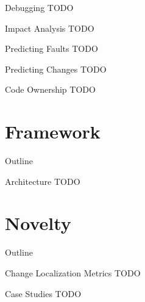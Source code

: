 
\begin{frame}{Debugging}
  TODO
\end{frame}


\begin{frame}{Impact Analysis}
  TODO
\end{frame}


\begin{frame}{Predicting Faults}
  TODO
\end{frame}


\begin{frame}{Predicting Changes}
  TODO
\end{frame}


\begin{frame}{Code Ownership}
  TODO
\end{frame}



\section{Framework}

\begin{frame}{Outline}
  \tableofcontents[current]
\end{frame}


\begin{frame}{Architecture}
  TODO
\end{frame}



\section{Novelty}

\begin{frame}{Outline}
  \tableofcontents[current]
\end{frame}


\begin{frame}{Change Localization Metrics}
  TODO
\end{frame}


\begin{frame}{Case Studies}
  TODO
\end{frame}

